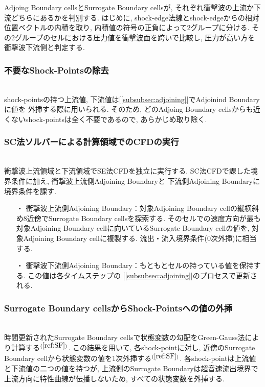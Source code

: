 \documentclass[a4j]{jarticle}
\begin{document}
Adjoing Boundary cellsとSurrogate Boundary cellsが, それぞれ衝撃波の上流か下流どちらにあるかを判別する.
はじめに, shock-edge法線とshock-edgeからの相対位置ベクトルの内積を取り, 内積値の符号の正負によって2グループに分ける.
その2グループのセルにおける圧力値を衝撃波面を跨いで比較し, 圧力が高い方を衝撃波下流側と判定する.

\subsubsection{不要なShock-Pointsの除去} \label{subsubsec:remove}
\mbox{}\\[-1.0ex]

shock-pointsの持つ上流値, 下流値は[\ref{subsubsec:adjoining}]でAdjoinind Boundaryに値を
外挿する際に用いられる. そのため, どのAdjoing Boundary cellsからも近くないshock-pointsは全く不要であるので,
あらかじめ取り除く.

\subsubsection{SC法ソルバーによる計算領域でのCFDの実行} \label{subsubsec:sc}
\mbox{}\\[-1.0ex]
衝撃波上流領域と下流領域でSE法CFDを独立に実行する. SC法CFDで課した境界条件に加え, 衝撃波上流側Adjoining Boundaryと
下流側Adjoining Boundaryに境界条件を課す.
\begin{itemize}
  \item[・]  衝撃波上流側Adjoining Boundary：対象Adjoining Boundary cellの縦横斜め8近傍でSurrogate Boundary cellsを探索する. 
            そのセルでの速度方向が最も対象Adjoining Boundary cellに向いているSurrogate Boundary cellの値を, 対象Adjoining Boundary cellに複製する. 流出・流入境界条件(0次外挿)に相当する.
  \item[・]  衝撃波下流側Adjoining Boundary：もともとセルの持っている値を保持する. この値は各タイムステップの
            [\ref{subsubsec:adjoining}]のプロセスで更新される.
\end{itemize}

\subsubsection{Surrogate Boundary cellsからShock-Pointsへの値の外挿} \label{subsubsec:extrapolate}
\mbox{}\\[-1.0ex]

時間更新されたSurrogate Boundary cellsで状態変数の勾配をGreen-Gauss法により計算する$^{(\ref{ref:SF})}$.
この結果を用いて, 各shock-pointに対し, 近傍のSurrogate Boundary cellから状態変数の値を1次外挿する$^{(\ref{ref:SF})}$.
各shock-pointは上流値と下流値の二つの値を持つが,
上流側のSurrogate Boundaryは超音速流出境界で上流方向に特性曲線が伝播しないため, 
すべての状態変数を外挿する.
\end{document}
